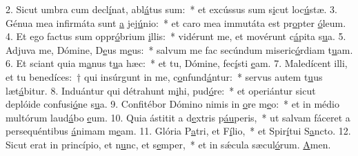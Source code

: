2. Sicut umbra cum decl\uline{í}nat, abl\uline{á}tus sum:~* et excússus sum s\uline{i}cut loc\uline{ú}stæ.
3. Génua mea infirmáta sunt \uline{a} jej\uline{ú}nio:~* et caro mea immutáta est pr\uline{o}pter \uline{ó}leum.
4. Et ego factus sum oppr\uline{ó}brium \uline{i}llis:~* vidérunt me, et movérunt c\uline{á}pita s\uline{u}a.
5. Adjuva me, Dómine, D\uline{e}us m\uline{e}us:~* salvum me fac secúndum miseric\uline{ó}rdiam t\uline{u}am.
6. Et sciant quia m\uline{a}nus t\uline{u}a hæc:~* et tu, Dómine, fec\uline{í}sti \uline{e}am.
7. Maledícent illi, et tu benedíces:~† qui insúrgunt in me, c\uline{o}nfund\uline{á}ntur:~* servus autem t\uline{u}us læt\uline{á}bitur.
8. Induántur qui détrahunt m\uline{i}hi, pud\uline{ó}re:~* et operiántur sicut deplóide confusi\uline{ó}ne s\uline{u}a.
9. Confitébor Dómino nimis in \uline{o}re m\uline{e}o:~* et in médio multórum laud\uline{á}bo \uline{e}um.
10. Quia ástitit a d\uline{e}xtris p\uline{áu}peris,~* ut salvam fáceret a persequéntibus \uline{á}nimam m\uline{e}am.
11. Glória P\uline{a}tri, et F\uline{í}lio,~* et Spir\uline{í}tui S\uline{a}ncto.
12. Sicut erat in princípio, et n\uline{u}nc, et s\uline{e}mper,~* et in sǽcula sæcul\uline{ó}rum. \uline{A}men.
